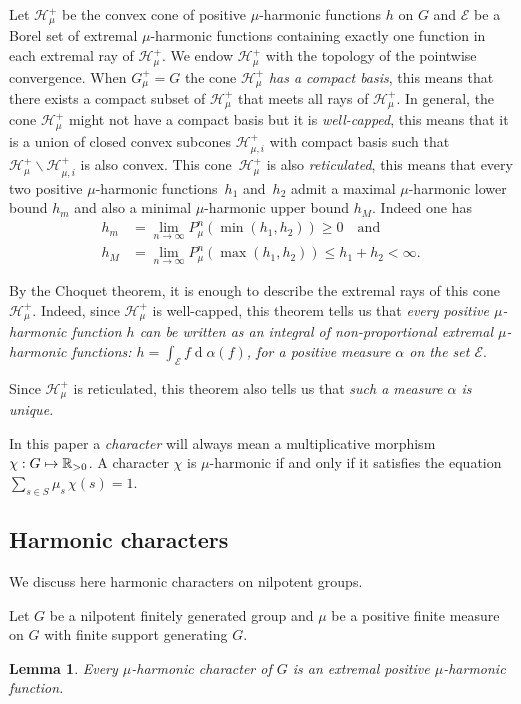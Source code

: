 \documentclass[11pt]{article}
\numberwithin{equation}{section}
\let\mathcal\mathscr
\def\mto{\mathchoice{\longmapsto}{\mapsto}{\mapsto}{\mapsto}}
\DeclareMathOperator{\rd}{d}
\newtheorem{Lem}[Thm]{Lemma}
\theoremstyle{definition}
\newcommand{\m}[1]{\mathbb{ #1}}
\newcommand{\mc}[1]{\mathcal{ #1}}
\let\al\alpha
\let\bq\relax
\let\eq\relax
\let\ra\to
\begin{document}
Let $\mc H_\mu^+$ be the convex cone of positive
$\mu$-harmonic functions $h$ on $G$
and $\mc E$ be a Borel set of extremal $\mu$-harmonic functions containing exactly one
function in each extremal ray of $\mc H_\mu^+$.
We endow $\mc H_\mu^+$ with the topology of the pointwise convergence.
When $G_\mu^+=G$ the cone $\mc H_\mu^+$ \emph{has a compact basis},
this means that there exists a compact subset of $\mc H_\mu^+$
that meets all rays of $\mc H_\mu^+$.
In general, the cone $\mc H_\mu^+$ might not have a compact basis but it is \emph{well-capped},
this means that it is a union of closed convex subcones $\mc H_{\mu,i}^+$
with compact basis such that $\mc H_\mu^+\smallsetminus \mc H_{\mu,i}^+$
is also convex.
This cone~$\mc H_\mu^+$ is also \emph{reticulated}, this means that
every two positive $\mu$-harmonic functions~$h_1$ and~$h_2$
admit a maximal $\mu$-harmonic lower bound $h_m$ and also
a minimal $\mu$-harmonic upper bound $h_M$.
Indeed one has
\begin{align*}
h_m
&=
\lim_{n\ra\infty}P^n_\mu (\min(h_1,h_2))\geq 0
\quad\text{and}\quad \\
h_M
&=
\lim_{n\ra\infty}P^n_\mu (\max(h_1,h_2))
\leq h_1+ h_2<\infty.
\end{align*}

By the Choquet theorem, it is enough to describe the extremal rays of this cone~$\mc H_\mu^+$.
Indeed, since $\mc H_\mu^+$ is well-capped, this theorem tells us
that \emph{every positive $\mu$-harmonic function $h$
can be written as an integral of non-proportional
extremal $\mu$-harmonic functions:
$h=\int_{\mc E}f\rd \al(f)$,
for a positive measure $\al$
on the set $\mc E$}.

Since $\mc H_\mu^+$ is reticulated,
this theorem also tells us that \emph{such a measure $\al$ is unique.}

In this paper a \emph{character}
will always mean a multiplicative morphism $\chi:G\mto \m R_{>0}$.
A character $\chi$ is $\mu$-harmonic if and only if it satisfies
the equation $\sum_{s\in S} \mu_s\,\chi(s)=1$.

\subsection{Harmonic characters}
\bq
We discuss here harmonic characters on nilpotent groups.
\eq

Let $G$ be a nilpotent finitely generated group
and $\mu$ be a positive finite measure on $G$
with finite support generating $G$.

\begin{Lem}
\label{lemcarext}
Every $\mu$-harmonic character of $G$ is an extremal
positive $\mu$-harmonic function.
\end{Lem}
\end{document}
